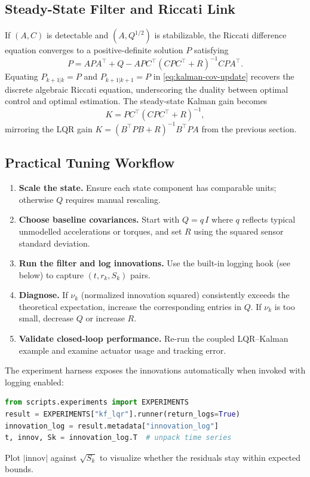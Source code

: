 \subsection{Steady-State Filter and Riccati Link}
If $(A, C)$ is detectable and $(A, Q^{1/2})$ is stabilizable, the Riccati difference equation converges to a positive-definite solution $P$ satisfying
\begin{equation}
    P = A P A^\top + Q - A P C^\top (C P C^\top + R)^{-1} C P A^\top. \label{eq:dares}
\end{equation}
Equating $P_{k+1|k} = P$ and $P_{k+1|k+1} = P$ in \eqref{eq:kalman-cov-update} recovers the discrete algebraic Riccati equation, underscoring the duality between optimal control and optimal estimation. The steady-state Kalman gain becomes
\[
    K = P C^\top (C P C^\top + R)^{-1},
\]
mirroring the LQR gain $K = (B^\top P B + R)^{-1} B^\top P A$ from the previous section.

\subsection{Practical Tuning Workflow}
\begin{enumerate}[leftmargin=*]
    \item \textbf{Scale the state.} Ensure each state component has comparable units; otherwise $Q$ requires manual rescaling.
    \item \textbf{Choose baseline covariances.} Start with $Q = q\,I$ where $q$ reflects typical unmodelled accelerations or torques, and set $R$ using the squared sensor standard deviation.
    \item \textbf{Run the filter and log innovations.} Use the built-in logging hook (see below) to capture $(t, r_k, S_k)$ pairs.
    \item \textbf{Diagnose.} If $\nu_k$ (normalized innovation squared) consistently exceeds the theoretical expectation, increase the corresponding entries in $Q$. If $\nu_k$ is too small, decrease $Q$ or increase $R$.
    \item \textbf{Validate closed-loop performance.} Re-run the coupled LQR--Kalman example and examine actuator usage and tracking error.
\end{enumerate}
The experiment harness exposes the innovations automatically when invoked with logging enabled:
\begin{lstlisting}[language=python]
from scripts.experiments import EXPERIMENTS
result = EXPERIMENTS["kf_lqr"].runner(return_logs=True)
innovation_log = result.metadata["innovation_log"]
t, innov, Sk = innovation_log.T  # unpack time series
\end{lstlisting}
Plot $|\text{innov}|$ against $\sqrt{S_k}$ to visualize whether the residuals stay within expected bounds.

